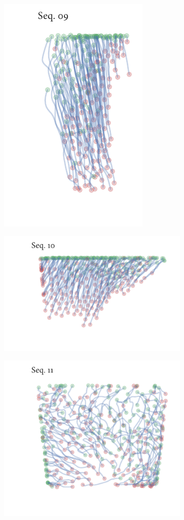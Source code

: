 \begin{figure}[h]
\begin{subfigure}[t]{0.5\textwidth}
		\centering
		\includegraphics{streamline_sequence09.pdf}
	\end{subfigure}%
	\begin{subfigure}[t]{0.5\textwidth}
		\centering
		\includegraphics{streamline_sequence10.pdf}
	\end{subfigure}
	\begin{subfigure}[t]{0.5\textwidth}
		\centering
		\includegraphics{streamline_sequence11.pdf}

\end{subfigure}
\end{figure}
